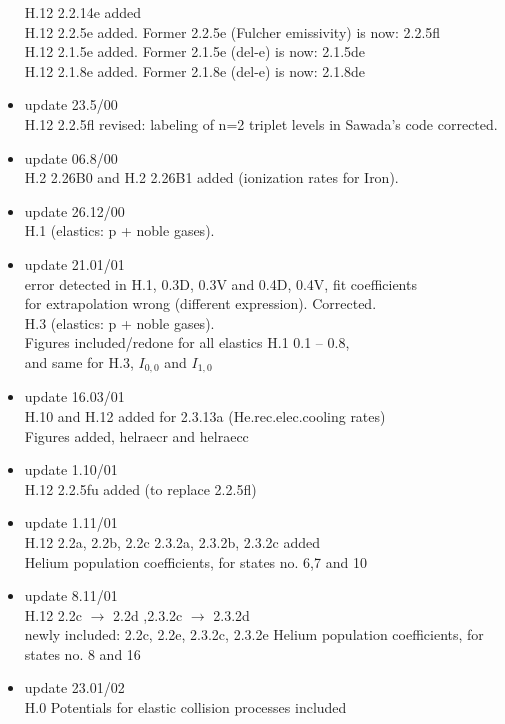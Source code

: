 \documentclass[12pt,dvipdfmx]{article}
\begin{document}
\begin{itemize}
  H.12 2.2.14e added                          \\
  H.12 2.2.5e added. Former 2.2.5e (Fulcher emissivity) is now:
                            2.2.5fl\\
  H.12 2.1.5e added. Former 2.1.5e (del-e) is now: 2.1.5de \\
  H.12 2.1.8e added. Former 2.1.8e (del-e) is now: 2.1.8de
 \item update  23.5/00 \\
  H.12 2.2.5fl revised: labeling of n=2 triplet levels in Sawada's
  code corrected.
 \item update  06.8/00 \\
  H.2 2.26B0 and H.2 2.26B1 added (ionization rates for Iron).
 \item update  26.12/00 \\
  H.1 (elastics: p + noble gases).
 \item update  21.01/01 \\
  error detected in H.1, 0.3D, 0.3V and 0.4D, 0.4V, fit coefficients\\
  for extrapolation wrong (different expression). Corrected.\\
  H.3 (elastics: p + noble gases).\\
  Figures included/redone for all elastics H.1  0.1 -- 0.8, \\
  and same for H.3, $I_{0,0}$ and $I_{1,0}$
 \item update  16.03/01 \\
  H.10 and H.12 added for 2.3.13a (He.rec.elec.cooling rates)\\
  Figures added, helraecr and helraecc
 \item update  1.10/01 \\
  H.12  2.2.5fu added (to replace 2.2.5fl)
 \item update  1.11/01 \\
  H.12  2.2a, 2.2b, 2.2c 2.3.2a, 2.3.2b, 2.3.2c added \\
  Helium population coefficients, for states no. 6,7 and 10
 \item update  8.11/01 \\
  H.12  2.2c $\rightarrow$ 2.2d ,2.3.2c $\rightarrow$ 2.3.2d \\
  newly included: 2.2c, 2.2e,  2.3.2c,  2.3.2e
  Helium population coefficients, for states no. 8 and 16
 \item update  23.01/02 \\
  H.0  Potentials for elastic collision processes included\\

\end{itemize}
\end{document}
